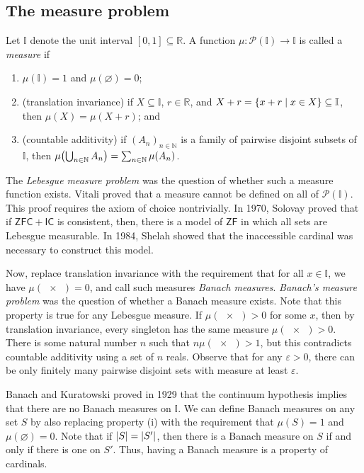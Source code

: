 \subsection{The measure problem}
Let \( \mathbb I \) denote the unit interval \( [0,1] \subseteq \mathbb R \).
A function \( \mu : \mathcal P(\mathbb I) \to \mathbb I \) is called a \emph{measure} if
\begin{enumerate}
    \item \( \mu(\mathbb I) = 1 \) and \( \mu(\varnothing) = 0 \);
    \item (translation invariance) if \( X \subseteq \mathbb I \), \( r \in \mathbb R \), and \( X + r = \qty{x + r \mid x \in X} \subseteq \mathbb I \), then \( \mu(X) = \mu(X + r) \); and
    \item (countable additivity) if \( (A_n)_{n \in \mathbb N} \) is a family of pairwise disjoint subsets of \( \mathbb I \), then \( \mu\qty(\bigcup_{n \in \mathbb N} A_n) = \sum_{n \in \mathbb N}\mu(A_n) \).
\end{enumerate}
The \emph{Lebesgue measure problem} was the question of whether such a measure function exists.
Vitali proved that a measure cannot be defined on all of \( \mathcal P(\mathbb I) \).
This proof requires the axiom of choice nontrivially.
In 1970, Solovay proved that if \( \mathsf{ZFC} + \mathsf{IC} \) is consistent, then, there is a model of \( \mathsf{ZF} \) in which all sets are Lebesgue measurable.
In 1984, Shelah showed that the inaccessible cardinal was necessary to construct this model.

Now, replace translation invariance with the requirement that for all \( x \in \mathbb I \), we have \( \mu(\qty{x}) = 0 \), and call such measures \emph{Banach measures}.
\emph{Banach's measure problem} was the question of whether a Banach measure exists.
Note that this property is true for any Lebesgue measure.
If \( \mu(\qty{x}) > 0 \) for some \( x \), then by translation invariance, every singleton has the same measure \( \mu(\qty{x}) > 0 \).
There is some natural number \( n \) such that \( n \mu(\qty{x}) > 1 \), but this contradicts countable additivity using a set of \( n \) reals.
Observe that for any \( \varepsilon > 0 \), there can be only finitely many pairwise disjoint sets with measure at least \( \varepsilon \).

Banach and Kuratowski proved in 1929 that the continuum hypothesis implies that there are no Banach measures on \( \mathbb I \).
We can define Banach measures on any set \( S \) by also replacing property (i) with the requirement that \( \mu(S) = 1 \) and \( \mu(\varnothing) = 0 \).
Note that if \( \abs{S} = \abs{S'} \), then there is a Banach measure on \( S \) if and only if there is one on \( S' \).
Thus, having a Banach measure is a property of cardinals.

